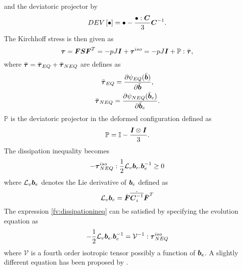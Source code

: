 \documentclass[11pt,a4paper]{article}
\newcommand{\parder}[2]{{\dfrac{\partial #1}{\partial #2}}}
\begin{document}
and the deviatoric projector by
\begin{equation}
DEV\left[ \bullet\right] = \bullet - \frac{\bullet:\mbox{\boldmath $C$}}{3} \mbox{\boldmath $C$}^{-1}.
\end{equation}
The Kirchhoff stress is then given as
\begin{equation}
	\boldsymbol{\tau} = \mbox{\boldmath $F$} \mbox{\boldmath $S$} \mbox{\boldmath $F$}^T = -pJ\mbox{\boldmath $I$} + {\mbox{\boldmath $\tau$}}^{iso} = -pJ\mbox{\boldmath $I$} + \mathbb{P}:\bar{\mbox{\boldmath $\tau$}},
\end{equation}
where $\bar{\mbox{\boldmath $\tau$}} = \bar{\mbox{\boldmath $\tau$}}_{EQ} + \bar{\mbox{\boldmath $\tau$}}_{NEQ}$ are defines as 
\begin{gather}
	\bar{\bftau}_{EQ} = \parder{\psi_{EQ}(\bar{\bfb})}{\bar{\bfb}}, \\
	\bar{\bftau}_{NEQ} = \parder{\psi_{NEQ}(\bar{\bfb}_e)}{\bar{\bfb}_e}.
\end{gather}
$\mathbb{P}$ is the deviatoric projector in the deformed configuration defined as 
\begin{equation}
\mathbb{P} = \mathbb{I} - \frac{\mbox{\boldmath $I$} \otimes \mbox{\boldmath $I$}}{3}.
\end{equation}
The dissipation inequality becomes 
\begin{equation}
-\boldsymbol{\tau}_{NEQ}^{iso}:\frac{1}{2} \mathcal{L}_v\mbox{\boldmath $b$}_e. \mbox{\boldmath $b$}_e^{-1} \geq 0
\label{fv:dissipationineq}
\end{equation}
where $\mathcal{L}_v\mbox{\boldmath $b$}_e$ denotes the Lie derivative of $\mbox{\boldmath $b$}_e$ defined as 
\begin{equation}
\mathcal{L}_v\mbox{\boldmath $b$}_e = \bar{\mbox{\boldmath $F$}} \dot{\overline{ \mbox{\boldmath $C$}_i^{-1}}} \bar{\mbox{\boldmath $F$}}^T
\end{equation}
The expression \ref{fv:dissipationineq} can be satisfied by specifying the evolution equation as
\begin{equation}
-\frac{1}{2} \mathcal{L}_v\mbox{\boldmath $b$}_e. \mbox{\boldmath $b$}_e^{-1}  = \mathcal{V}^{-1} : \boldsymbol{\tau}_{NEQ}^{iso}
\label{fv:evolution}
\end{equation}
where $\mathcal{V}$ is a fourth order isotropic tensor possibly a function of $\mbox{\boldmath $b$}_e$. A slightly different equation has been proposed by \cite{Bergstrom1998}.
\end{document}
